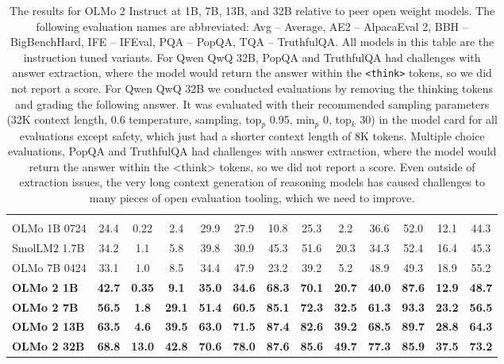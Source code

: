\documentclass[table]{ai2style/ai2}
\begin{document}
\begin{table}[!htbp]
{\begin{tabular}{lcccccccccccc}
\rowcolor{ai2midpink}\multicolumn{13}{c}{\textbf{Fully-open Language Models}} \\
\rowcolor{ai2lightpink} OLMo 1B 0724 & 24.4 & 0.22 & 2.4 & 29.9 & 27.9 & 10.8 & 25.3 & 2.2 & 36.6 & 52.0 & 12.1 & 44.3 \\
\rowcolor{ai2lightpink}
SmolLM2 1.7B & 34.2 & 1.1 & 5.8 & 39.8 & 30.9 & 45.3 & 51.6 & 20.3 & 34.3 & 52.4 & 16.4 & 45.3 \\
\rowcolor{ai2lightpink} OLMo 7B 0424 & 33.1 & 1.0 & 8.5 & 34.4 & 47.9 & 23.2 & 39.2 & 5.2 & 48.9 & 49.3 & 18.9 & 55.2 \\
\rowcolor{ai2lightpink} \textbf{OLMo 2 1B} & \textbf{42.7} & \textbf{0.35} & \textbf{9.1} & \textbf{35.0} & \textbf{34.6} & \textbf{68.3} & \textbf{70.1} & \textbf{20.7} & \textbf{40.0} & \textbf{87.6} & \textbf{12.9} & \textbf{48.7} \\
 \rowcolor{ai2lightpink} \textbf{OLMo 2 7B} & \textbf{56.5} & \textbf{1.8} & \textbf{29.1} & \textbf{51.4} & \textbf{60.5} & \textbf{85.1} & \textbf{72.3} & \textbf{32.5} & \textbf{61.3} & \textbf{93.3} & \textbf{23.2} & \textbf{56.5} \\
\rowcolor{ai2lightpink} \textbf{OLMo 2 13B} & \textbf{63.5} & \textbf{4.6} & \textbf{39.5} & \textbf{63.0} & \textbf{71.5} & \textbf{87.4} & \textbf{82.6} & \textbf{39.2} & \textbf{68.5} & \textbf{89.7} & \textbf{28.8} & \textbf{64.3} \\
\rowcolor{ai2lightpink} \textbf{OLMo 2 32B} & \textbf{68.8} & \textbf{13.0} & \textbf{42.8} & \textbf{70.6} & \textbf{78.0} & \textbf{87.6} & \textbf{85.6} & \textbf{49.7} & \textbf{77.3} & \textbf{85.9} & \textbf{37.5} & \textbf{73.2} \\
\bottomrule
\end{tabular}
}
\caption{The results for OLMo 2 Instruct at 1B, 7B, 13B, and 32B relative to peer open weight models.
The following evaluation names are abbreviated: Avg -- Average, AE2 -- AlpacaEval 2, BBH -- BigBenchHard, IFE -- IFEval, PQA -- PopQA, TQA -- TruthfulQA. All models in this table are the instruction tuned variants.
For Qwen QwQ 32B, PopQA and TruthfulQA had challenges with answer extraction, where the model would return the answer within the \texttt{<think>} tokens, so we did not report a score.
For Qwen QwQ 32B we conducted evaluations by removing the thinking tokens and grading the following answer. 
It was evaluated with their recommended sampling parameters (32K context length, 0.6 temperature, sampling, top$_p$ 0.95, min$_p$ 0, top$_k$ 30) in the model card for all evaluations except safety, which just had a shorter context length of 8K tokens. Multiple choice evaluations, PopQA and TruthfulQA had challenges with answer extraction, where the model would return the answer within the <think> tokens, so we did not report a score. Even outside of extraction issues, the very long context generation of reasoning models has caused challenges to many pieces of open evaluation tooling, which we need to improve.
}
\label{tab:instruct_results}
\end{table}
\end{document}
